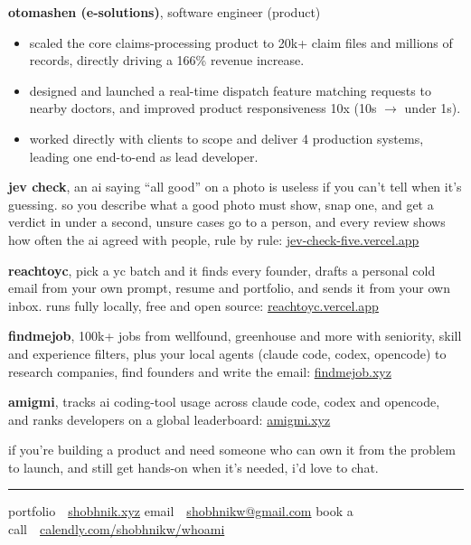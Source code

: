\documentclass[10pt,a4paper]{article}
\newcommand{\heading}[1]{\vspace{4pt}{\color{accent}\footnotesize\bfseries\MakeUppercase{#1}}\par\vspace{-2pt}}
\newcommand{\lnk}[2]{\href{#1}{#2}}
\newcommand{\hr}{{\color{rulegray}\rule{\linewidth}{0.6pt}}}
\begin{document}
\textbf{otomashen (e-solutions)}, software engineer (product)
\begin{itemize}
\item scaled the core claims-processing product to 20k+ claim files and millions of records, directly driving a 166\% revenue increase.
\item designed and launched a real-time dispatch feature matching requests to nearby doctors, and improved product responsiveness 10x (10s $\rightarrow$ under 1s).
\item worked directly with clients to scope and deliver 4 production systems, leading one end-to-end as lead developer.
\end{itemize}

\heading{products i've built on my own}

\textbf{jev check}, an ai saying ``all good'' on a photo is useless if you can't tell when it's guessing. so you describe what a good photo must show, snap one, and get a verdict in under a second, unsure cases go to a person, and every review shows how often the ai agreed with people, rule by rule: \lnk{https://jev-check-five.vercel.app}{jev-check-five.vercel.app}

\textbf{reachtoyc}, pick a yc batch and it finds every founder, drafts a personal cold email from your own prompt, resume and portfolio, and sends it from your own inbox. runs fully locally, free and open source: \lnk{https://reachtoyc.vercel.app}{reachtoyc.vercel.app}

\textbf{findmejob}, 100k+ jobs from wellfound, greenhouse and more with seniority, skill and experience filters, plus your local agents (claude code, codex, opencode) to research companies, find founders and write the email: \lnk{https://findmejob.xyz}{findmejob.xyz}

\textbf{amigmi}, tracks ai coding-tool usage across claude code, codex and opencode, and ranks developers on a global leaderboard: \lnk{https://amigmi.xyz}{amigmi.xyz}

if you're building a product and need someone who can own it from the problem to launch, and still get hands-on when it's needed, i'd love to chat.

\vspace{2pt}
\hr
\vspace{-4pt}

{\color{muted}portfolio}\ \ \lnk{https://shobhnik.xyz}{shobhnik.xyz}\qquad
{\color{muted}email}\ \ \lnk{mailto:shobhnikw@gmail.com}{shobhnikw@gmail.com}\qquad
{\color{muted}book a call}\ \ \lnk{https://calendly.com/shobhnikw/whoami}{calendly.com/shobhnikw/whoami}
\end{document}
